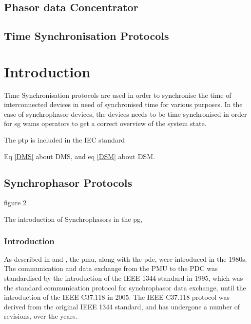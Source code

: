 \subsection{Phasor data Concentrator}




\subsection{Time Synchronisation Protocols}

\section{Introduction}
Time Synchronisation protocols are used in order to synchronise the time of interconnected devices in need of synchronised time for various purposes. In the case of synchrophasor devices, the devices needs to be time synchronised in order for \acrshort{sg} \acrshort{wams} operators to get a correct overview of the system state.



The \acrshort{ptp} is included in the IEC standard

Eq \ref{DMS} about DMS, and  eq \ref{DSM} about DSM.






\subsection{Synchrophasor Protocols}
\cite[p. 11]{johnson2018standards} figure 2

The introduction of Synchrophasors in the \acrlong{pg}, 

\subsubsection{Introduction}



As described in \cite{martin2011synchrophasor} and \cite{ali2016performance}, the \acrfull{pmu}, along with the \acrfull{pdc}, were introduced in the 1980s. The communication and data exchange from the PMU to the PDC was standardised by the introduction of the IEEE 1344 standard in 1995, which was the standard communication protocol for synchrophasor data exchange, until the introduction of the IEEE C37.118 in 2005.
The  IEEE C37.118 protocol was derived from the original IEEE 1344 standard, and has undergone a number of revisions, over the years.


